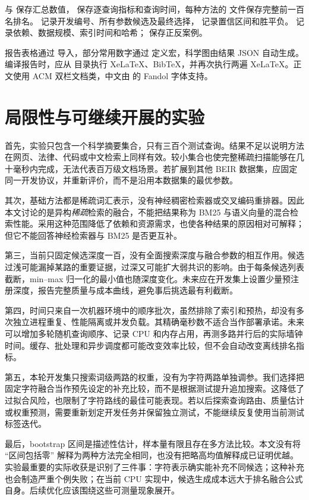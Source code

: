 \documentclass[sigconf,nonacm]{acmart}
\begin{document}
 与  保存汇总数值， 保存逐查询指标和查询时间，每种方法的  文件保存完整前一百名排名。 记录开发编号、所有参数候选及最终选择， 记录置信区间和胜平负。 记录依赖、数据规模、索引时间和哈希； 保存正反案例。

报告表格通过  导入，部分常用数字通过  定义宏，科学图由结果 JSON 自动生成。编译报告时，应从  目录执行 XeLaTeX、BibTeX，并再次执行两遍 XeLaTeX。正文使用 ACM  双栏文档类，中文由  的 Fandol 字体支持。

\section{局限性与可继续开展的实验}
首先，实验只包含一个科学摘要集合，只有三百个测试查询。结果不足以说明方法在网页、法律、代码或中文检索上同样有效。较小集合也使完整稀疏扫描能够在几十毫秒内完成，无法代表百万级文档场景。若扩展到其他 BEIR 数据集，应固定同一开发协议，并重新评价，而不是沿用本数据集的最优参数。

其次，基础方法都是稀疏词汇表示，没有神经稠密检索器或交叉编码重排器。因此本文讨论的是异构\emph{稀疏}检索的融合，不能把结果称为 BM25 与语义向量的混合检索性能。采用这种范围降低了依赖和资源需求，也使各种结果的原因相对可解释；但它不能回答神经检索器与 BM25 是否更互补。

第三，当前只固定候选深度一百，没有全面搜索深度与融合参数的相互作用。候选过浅可能漏掉某路的重要证据，过深又可能扩大弱共识的影响。由于每条候选列表截断，min--max 归一化的最小值也随深度变化。未来应在开发集上设置少量预注册深度，报告完整质量与成本曲线，避免事后挑选最有利截断。

第四，时间只来自一次机器环境中的顺序批次，虽然排除了索引和预热，却没有多次独立进程重复、性能隔离或并发负载。其精确毫秒数不适合当作部署承诺。未来可以增加多轮随机查询顺序、记录 CPU 和内存占用，再测多路并行后的实际墙钟时间。缓存、批处理和异步调度都可能改变效率比较，但不会自动改变离线排名指标。

第五，本轮开发集只搜索词级两路的权重，没有为字符两路单独调参。我们选择把固定字符融合当作预先设定的补充比较，而不是根据测试提升追加搜索。这降低了过拟合风险，也限制了字符路线的最佳可能表现。若以后探索查询路由、质量估计或权重预测，需要重新划定开发任务并保留独立测试，不能继续反复使用当前测试标签迭代。

最后，bootstrap 区间是描述性估计，样本量有限且存在多方法比较。本文没有将 ``区间包括零'' 解释为两种方法完全相同，也没有把略高均值解释成已证明优越。实验最重要的实际收获是识别了三件事：字符表示确实能补充不同候选；这种补充也会制造严重个例失败；在当前 CPU 实现中，候选生成成本远大于排名融合公式自身。后续优化应该围绕这些可测量现象展开。
\end{document}
